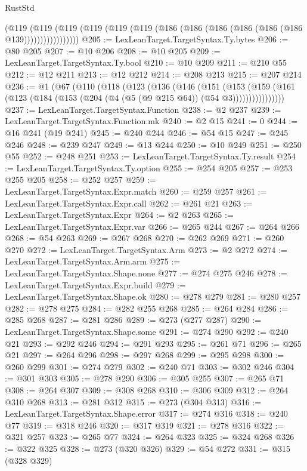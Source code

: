 \begin{lexlean}{RustStd}
\begin{coremodule}
              (@119
                (@119
                  (@119 (@119 (@119 (@119 (@186 (@186 (@186 (@186 (@186 (@186 @139)))))))))))))))))
@205 := LexLeanTarget.TargetSyntax.Ty.bytes
@206 := @80 @205
@207 := @10 @206
@208 := @10 @205
@209 := LexLeanTarget.TargetSyntax.Ty.bool
@210 := @10 @209
@211 := @210 @55
@212 := @12 @211
@213 := @12 @212
@214 := @208 @213
@215 := @207 @214
@236 := @1
    (@67
      (@110
        (@118
          (@123
            (@136
              (@146
                (@151
                  (@153
                    (@159
                      (@161 (@123 (@184 (@153 (@204 (@4 (@5 (@9 @215 @64)) (@54 @3))))))))))))))))
@237 := LexLeanTarget.TargetSyntax.Function
@238 := @2 @237
@239 := LexLeanTarget.TargetSyntax.Function.mk
@240 := @2 @15
@241 := 0
@244 := @16 @241 (@19 @241)
@245 := @240 @244
@246 := @54 @15
@247 := @245 @246
@248 := @239 @247
@249 := @13 @244
@250 := @10 @249
@251 := @250 @55
@252 := @248 @251
@253 := LexLeanTarget.TargetSyntax.Ty.result
@254 := LexLeanTarget.TargetSyntax.Ty.option
@255 := @254 @205
@257 := @253 @255 @205
@258 := @252 @257
@259 := LexLeanTarget.TargetSyntax.Expr.match
@260 := @259 @257
@261 := LexLeanTarget.TargetSyntax.Expr.call
@262 := @261 @21
@263 := LexLeanTarget.TargetSyntax.Expr
@264 := @2 @263
@265 := LexLeanTarget.TargetSyntax.Expr.var
@266 := @265 @244
@267 := @264 @266
@268 := @54 @263
@269 := @267 @268
@270 := @262 @269
@271 := @260 @270
@272 := LexLeanTarget.TargetSyntax.Arm
@273 := @2 @272
@274 := LexLeanTarget.TargetSyntax.Arm.arm
@275 := LexLeanTarget.TargetSyntax.Shape.none
@277 := @274 @275 @246
@278 := LexLeanTarget.TargetSyntax.Expr.build
@279 := LexLeanTarget.TargetSyntax.Shape.ok
@280 := @278 @279
@281 := @280 @257
@282 := @278 @275
@284 := @282 @255 @268
@285 := @264 @284
@286 := @285 @268
@287 := @281 @286
@289 := @273 (@277 @287)
@290 := LexLeanTarget.TargetSyntax.Shape.some
@291 := @274 @290
@292 := @240 @21
@293 := @292 @246
@294 := @291 @293
@295 := @261 @71
@296 := @265 @21
@297 := @264 @296
@298 := @297 @268
@299 := @295 @298
@300 := @260 @299
@301 := @274 @279
@302 := @240 @71
@303 := @302 @246
@304 := @301 @303
@305 := @278 @290
@306 := @305 @255
@307 := @265 @71
@308 := @264 @307
@309 := @308 @268
@310 := @306 @309
@312 := @264 @310 @268
@313 := @281 @312
@315 := @273 (@304 @313)
@316 := LexLeanTarget.TargetSyntax.Shape.error
@317 := @274 @316
@318 := @240 @77
@319 := @318 @246
@320 := @317 @319
@321 := @278 @316
@322 := @321 @257
@323 := @265 @77
@324 := @264 @323
@325 := @324 @268
@326 := @322 @325
@328 := @273 (@320 @326)
@329 := @54 @272
@331 := @315 (@328 @329)

\end{coremodule}
\end{lexlean}
